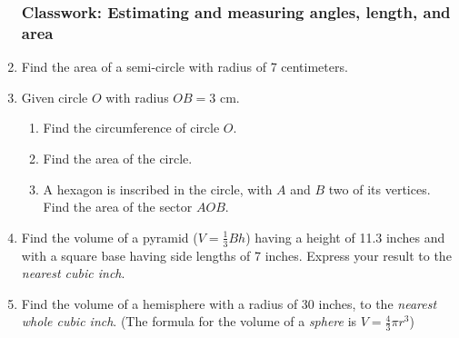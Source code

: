 \documentclass[12pt, twoside]{article}
\begin{document}
\begin{enumerate}
\newpage 
\subsubsection*{Classwork: Estimating and measuring angles, length, and area} 
  \item Find the area of a semi-circle with radius of 7 centimeters. \vspace{2cm}

  \item Given circle $O$ with radius $OB=3$ cm.
    \begin{multicols}{2}
    \raggedcolumns
    \begin{enumerate}
      \item Find the circumference of circle $O$. \vspace{1.7cm}
      \item Find the area of the circle.  \vspace{2cm}
      \item A hexagon is inscribed in the circle, with $A$ and $B$ two of its vertices. \\[0.25cm]
      Find the area of the sector $AOB$. \vspace{1.5cm}
    \end{enumerate}
    \end{multicols}  \vspace{4cm}

  \item Find the volume of a pyramid ($V=\frac{1}{3}Bh$) having a height of 11.3 inches and with a square base having side lengths of 7 inches. Express your result to the \emph{nearest cubic inch}. \vspace{5cm}

\newpage
  \item Find the volume of a hemisphere with a radius of 30 inches, to the \emph{nearest whole cubic inch}. (The formula for the volume of a \emph{sphere} is $V=\frac{4}{3}\pi r^3$) \vspace{5cm}


\end{enumerate}
\end{document}
